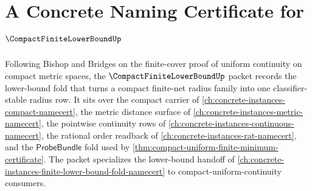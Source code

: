 \chapter{A Concrete Naming Certificate for $\CompactFiniteLowerBoundUp$}
\label{ch:concrete-instances-compact-finite-lower-bound-namecert}

Following Bishop and Bridges on the finite-cover proof of uniform continuity on compact metric spaces, the $\CompactFiniteLowerBoundUp$ packet records the lower-bound fold that turns a compact finite-net radius family into one classifier-stable radius row. It sits over the compact carrier of \autoref{ch:concrete-instances-compact-namecert}, the metric distance surface of \autoref{ch:concrete-instances-metric-namecert}, the pointwise continuity rows of \autoref{ch:concrete-instances-continuous-namecert}, the rational order readback of \autoref{ch:concrete-instances-rat-namecert}, and the $\mathsf{ProbeBundle}$ fold used by \autoref{thm:compact-uniform-finite-minimum-certificate}. The packet specializes the lower-bound handoff of \autoref{ch:concrete-instances-finite-lower-bound-fold-namecert} to compact-uniform-continuity consumers.

